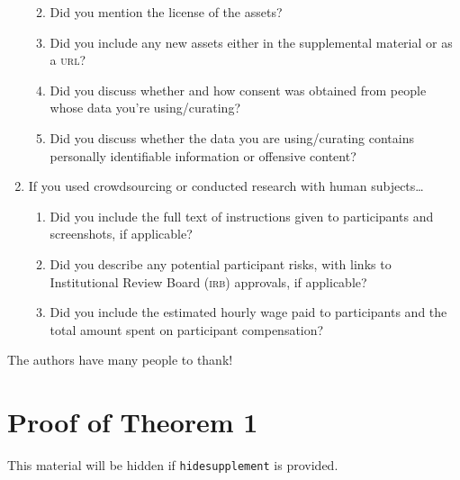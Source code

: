 \documentclass[11pt]{article}
\begin{document}
\begin{enumerate}
\begin{enumerate}
    \answerTODO{}
  \item Did you mention the license of the assets?
    \answerTODO{}
  \item Did you include any new assets either in the supplemental material or as
    a \textsc{url}?
    \answerTODO{}
  \item Did you discuss whether and how consent was obtained from people whose
    data you're using/curating?
    \answerTODO{}
  \item Did you discuss whether the data you are using/curating contains
    personally identifiable information or offensive content?
    \answerTODO{}
  \end{enumerate}
\item If you used crowdsourcing or conducted research with human subjects\dots
  \begin{enumerate}
  \item Did you include the full text of instructions given to participants and
    screenshots, if applicable?
    \answerTODO{}
  \item Did you describe any potential participant risks, with links to
    Institutional Review Board (\textsc{irb}) approvals, if applicable?
    \answerTODO{}
  \item Did you include the estimated hourly wage paid to participants and the
    total amount spent on participant compensation?
    \answerTODO{}
  \end{enumerate}
\end{enumerate}

\begin{acknowledgements}
  The authors have many people to thank!
\end{acknowledgements}






\appendix

\section{Proof of Theorem 1}

This material will be hidden if \texttt{hidesupplement} is provided.
\end{document}
